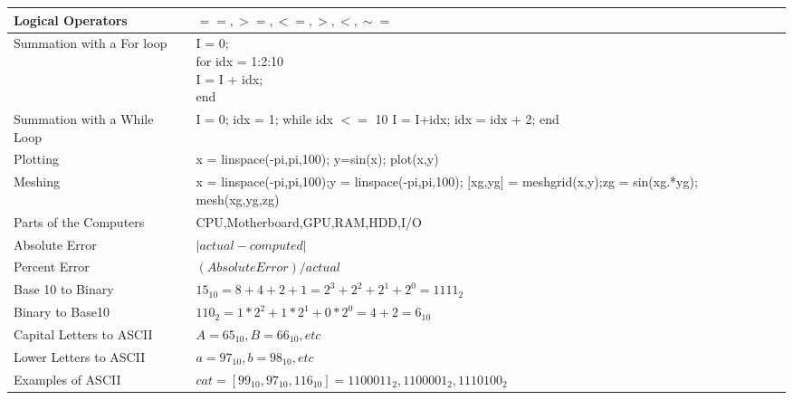 \documentclass[11pt,a4paper,twoside,openright]{book}
\begin{document}
\begin{tabular}{|l | l|}
  \hline
  Logical Operators & $==,>=,<=,>,<,\sim=$ \\
  \hline
  Summation with a For loop & \pbox{12cm} {I = 0; \\ for idx =
  1:2:10 \\ I = I + idx; \\ end} \\
  \hline
  Summation with a While Loop & \pbox{12cm}{I = 0; idx = 1;\\while idx $<=$ 10\\I = I+idx;\\idx = idx + 2;\\end}\\
  \hline
  Plotting & x = linspace(-pi,pi,100); y=sin(x); plot(x,y) \\
  \hline
  Meshing & \pbox{12cm}{x = linspace(-pi,pi,100);y =
    linspace(-pi,pi,100);\\ $[$xg,yg] = meshgrid(x,y);zg = sin(xg.*yg);\\mesh(xg,yg,zg)}\\
  \hline
  Parts of the Computers &
  CPU,Motherboard,GPU,RAM,HDD,I/O \\
  \hline
  Absolute Error & $|actual-computed|$ \\
  \hline
  Percent Error & $(Absolute Error)/actual$ \\
  \hline
  Base 10 to Binary & $15_{10} = 8 + 4 + 2 + 1 = 2^3 + 2^2 + 2^1 + 2^0
  = 1111_2$ \\
  \hline
  Binary to Base10 & $110_2 = 1*2^2 + 1*2^1 + 0*2^0 = 4+2 = 6_{10}$\\
  \hline
  Capital Letters to ASCII & $A = 65_{10}, B = 66_{10}, etc$ \\
  \hline
  Lower Letters to ASCII & $a = 97_{10}, b = 98_{10}, etc$ \\
  \hline
  Examples of ASCII & $cat = [99_{10},97_{10},116_{10}] = 1100011_2,1100001_2,1110100_2$\\
  \hline
\end{tabular}

\newpage
\end{document}
